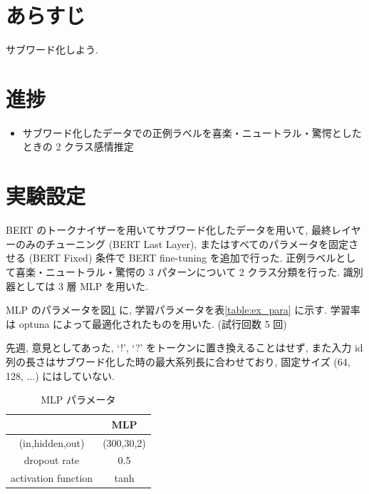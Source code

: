 \documentclass[twocolumn]{jarticle}     %
\begin{document}

\section{あらすじ}
サブワード化しよう.

\section{進捗}

\begin{itemize}
  \item サブワード化したデータでの正例ラベルを喜楽・ニュートラル・驚愕としたときの 2 クラス感情推定
\end{itemize}

\section{実験設定}
BERT のトークナイザーを用いてサブワード化したデータを用いて, 最終レイヤーのみのチューニング (BERT Last Layer), またはすべてのパラメータを固定させる (BERT Fixed) 条件で BERT fine-tuning を追加で行った. 正例ラベルとして喜楽・ニュートラル・驚愕の 3 パターンについて 2 クラス分類を行った. 識別器としては 3 層 MLP を用いた.

MLP のパラメータを図\ref{table:net_para} に, 学習パラメータを表\ref{table:ex_para} に示す. 学習率は optuna によって最適化されたものを用いた. (試行回数 5 回)

先週, 意見としてあった, `!', `?' をトークンに置き換えることはせず, また入力 id 列の長さはサブワード化した時の最大系列長に合わせており, 固定サイズ (64, 128, ...) にはしていない.

\begin{table}[htb]
\caption{MLP パラメータ}
\label{table:net_para}
\centering
\begin{tabular}{|c||c|}
\hline
& MLP \\ \hline
(in,hidden,out) & (300,30,2)\\ \hline
dropout rate & 0.5 \\ \hline
activation function & tanh\\ \hline
\end{tabular}
\end{table}
\end{document}
